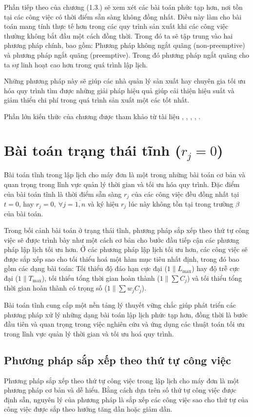 \documentclass[12pt,a4paper]{report}
\begin{document}
Phần tiếp theo của chương (1.3.) sẽ xem xét các bài toán phức tạp hơn, nơi tồn tại các công việc có thời điểm sẵn sàng không đồng nhất. Điều này làm cho bài toán mang tính thực tế hơn trong các quy trình sản xuất khi các công việc thường không bắt đầu một cách đồng thời. Trong đó ta sẽ tập trung vào hai phương pháp chính, bao gồm: Phương pháp không ngắt quãng (non-preemptive) và phương pháp ngắt quãng (preemptive). Trong đó phương pháp ngắt quãng cho ta sự linh hoạt cao hơn trong quá trình lập lịch.

Những phương pháp này sẽ giúp các nhà quản lý sản xuất hay chuyên gia tối ưu hóa quy trình tìm được những giải pháp hiệu quả giúp cải thiện hiệu suất và giảm thiểu chi phí trong quá trình sản xuất một các tốt nhất.

Phần lớn kiến thức của chương được tham khảo từ tài liệu \cite{minhhuy}, \cite{inbook}, \cite{pinedo2009planning}, \cite{PMBOK2013}, \cite{PostekZoccaAMPL2024}.

\section{Bài toán trạng thái tĩnh ($r_j = 0$)}
Bài toán tĩnh trong lập lịch cho máy đơn là một trong những bài toán cơ bản và quan trọng trong lĩnh vực quản lý thời gian và tối ưu hóa quy trình. Đặc điểm của bài toán tĩnh là thời điểm sẵn sàng $r_j$ của các công việc đều đồng nhất tại $t=0$, hay $r_j = 0, \: \forall j=\overline{1,n}$ và ký hiệu $r_j$ lúc này không tồn tại trong trường $\beta$ của bài toán.

Trong bối cảnh bài toán ở trạng thái tĩnh, phương pháp sắp xếp theo thứ tự công việc sẽ được trình bày như một cách cơ bản cho bước đầu tiếp cận các phương pháp lập lịch tối ưu hơn. Ở các phương pháp lập lịch tối ưu hơn, các công việc sẽ được sắp xếp sao cho tối thiểu hoá một hàm mục tiêu nhất định, trong đó bao gồm các dạng bài toán: Tối thiểu độ đáo hạn cực đại ($1\|L_{\max}$) hay độ trễ cực đại ($1\|T_{\max}$), tối thiểu tổng thời gian hoàn thành ($1\|\sum C_j$) và tối thiểu tổng thời gian hoàn thành có trọng số ($1\|\sum w_j C_j$).

Bài toán tĩnh cung cấp một nền tảng lý thuyết vững chắc giúp phát triển các phương pháp xử lý những dạng bài toán lập lịch phức tạp hơn, đồng thời là bước đầu tiên và quan trọng trong việc nghiên cứu và ứng dụng các thuật toán tối ưu trong lĩnh vực quản lý thời gian và tối ưu hoá quy trình.
\subsection{Phương pháp sắp xếp theo thứ tự công việc}
Phương pháp sắp xếp theo thứ tự công việc trong lập lịch cho máy đơn là một phương pháp cơ bản và dễ hiểu. Bằng cách dựa trên số thứ tự công việc được định sẵn, nguyên lý của phương pháp là sắp xếp các công việc sao cho thứ tự của công việc được sắp theo hướng tăng dần hoặc giảm dần.
\end{document}
